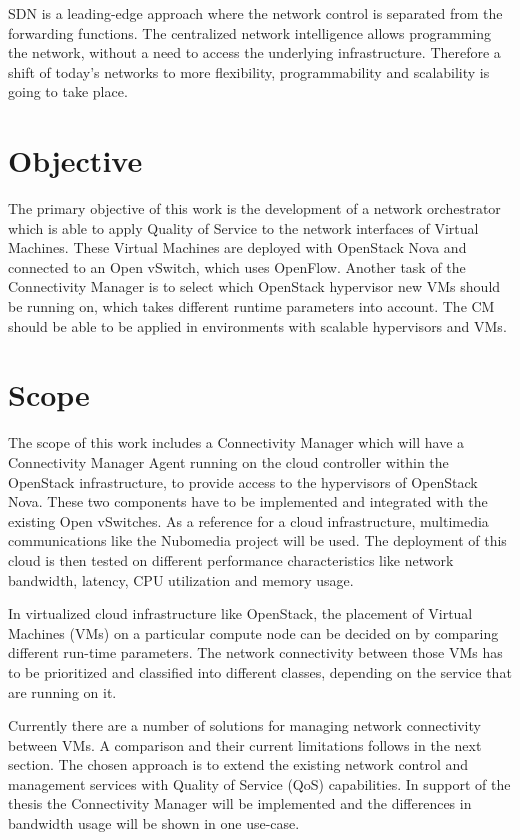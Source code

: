 SDN is a leading-edge approach where the network control is separated from the forwarding functions. The centralized network intelligence allows programming the network, without a need to access the underlying infrastructure. Therefore a shift of today's networks to more flexibility, programmability and scalability is going to take place.

\section{Objective}

The primary objective of this work is the development of a network orchestrator which is able to apply Quality of Service to the network interfaces of Virtual Machines. These Virtual Machines are deployed with OpenStack Nova and connected to an Open vSwitch, which uses OpenFlow. Another task of the Connectivity Manager is to select which OpenStack hypervisor new VMs should be running on, which takes different runtime parameters into account. The CM should be able to be applied in environments with scalable hypervisors and VMs.

\section{Scope}
The scope of this work includes a Connectivity Manager which will have a Connectivity Manager Agent running on the cloud controller within the OpenStack infrastructure, to provide access to the hypervisors of OpenStack Nova. These two components have to be implemented and integrated with the existing Open vSwitches. As a reference for a cloud infrastructure, multimedia communications like the Nubomedia project will be used. The deployment of this cloud is then tested on different performance characteristics like network bandwidth, latency, CPU utilization and memory usage.

In virtualized cloud infrastructure like OpenStack, the placement of Virtual Machines (VMs) on a particular compute node can be decided on by comparing different run-time parameters. The network connectivity between those VMs has to be prioritized and classified into different classes, depending on the service that are running on it.

Currently there are a number of solutions for managing network connectivity between VMs. A comparison and their current limitations follows in the next section. The chosen approach is to extend the existing network control and management services with Quality of Service (QoS) capabilities. In support of the thesis the Connectivity Manager will be implemented and the differences in bandwidth usage will be shown in one use-case.

